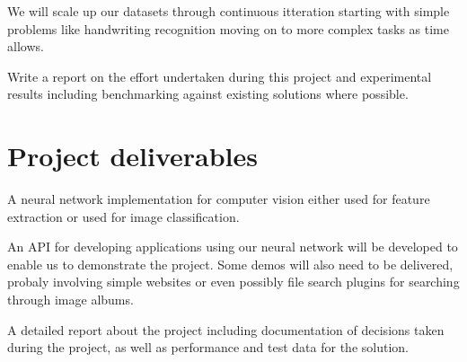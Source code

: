 \documentclass[11pt,fleqn,twoside]{article}
\begin{document}
We will scale up our datasets through continuous itteration starting with simple problems like handwriting recognition moving on to more complex tasks as time allows.

Write a report on the effort undertaken during this project and experimental results including benchmarking against existing solutions where possible.


\section{Project deliverables}
A neural network implementation for computer vision either used for feature extraction or used for image classification.

An API for developing applications using our neural network will be developed to enable us to demonstrate the project. Some demos will also need to be delivered, probaly involving simple websites or even possibly file search plugins for searching through image albums.

A detailed report about the project including documentation of decisions taken during the project, as well as performance and test data for the solution.

%
%
\section*{}
%



\nocite{*} %

\newpage
{} 

%
%

\renewcommand{\refname}{Annotated Bibliography}  %
\end{document}
